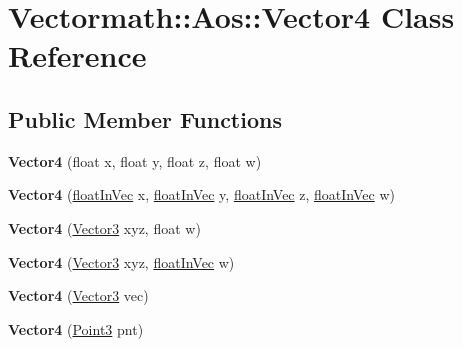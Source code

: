 \hypertarget{classVectormath_1_1Aos_1_1Vector4}{\section{Vectormath\-:\-:Aos\-:\-:Vector4 Class Reference}
\label{classVectormath_1_1Aos_1_1Vector4}
}
\subsection*{Public Member Functions}
\begin{DoxyCompactItemize}
\item 
\hypertarget{classVectormath_1_1Aos_1_1Vector4_a3a9a8ea181eeb2b2a3932149ad5c50ea}{{\bfseries Vector4} (float x, float y, float z, float w)}\label{classVectormath_1_1Aos_1_1Vector4_a3a9a8ea181eeb2b2a3932149ad5c50ea}

\item 
\hypertarget{classVectormath_1_1Aos_1_1Vector4_a648b4da425550137eec6f11d68ffca88}{{\bfseries Vector4} (\hyperlink{classVectormath_1_1floatInVec}{float\-In\-Vec} x, \hyperlink{classVectormath_1_1floatInVec}{float\-In\-Vec} y, \hyperlink{classVectormath_1_1floatInVec}{float\-In\-Vec} z, \hyperlink{classVectormath_1_1floatInVec}{float\-In\-Vec} w)}\label{classVectormath_1_1Aos_1_1Vector4_a648b4da425550137eec6f11d68ffca88}

\item 
\hypertarget{classVectormath_1_1Aos_1_1Vector4_a48ce5327a58b19ab2c6b6072b766c6c1}{{\bfseries Vector4} (\hyperlink{classVectormath_1_1Aos_1_1Vector3}{Vector3} xyz, float w)}\label{classVectormath_1_1Aos_1_1Vector4_a48ce5327a58b19ab2c6b6072b766c6c1}

\item 
\hypertarget{classVectormath_1_1Aos_1_1Vector4_aa77e89a39eb60531ddb91e2be801a3a9}{{\bfseries Vector4} (\hyperlink{classVectormath_1_1Aos_1_1Vector3}{Vector3} xyz, \hyperlink{classVectormath_1_1floatInVec}{float\-In\-Vec} w)}\label{classVectormath_1_1Aos_1_1Vector4_aa77e89a39eb60531ddb91e2be801a3a9}

\item 
\hypertarget{classVectormath_1_1Aos_1_1Vector4_a6a5b8614b89e1d8f656b4687bddd542e}{{\bfseries Vector4} (\hyperlink{classVectormath_1_1Aos_1_1Vector3}{Vector3} vec)}\label{classVectormath_1_1Aos_1_1Vector4_a6a5b8614b89e1d8f656b4687bddd542e}

\item 
\hypertarget{classVectormath_1_1Aos_1_1Vector4_a83c2f3eb3f5b1d248e6cfe483dc722e1}{{\bfseries Vector4} (\hyperlink{classVectormath_1_1Aos_1_1Point3}{Point3} pnt)}\label{classVectormath_1_1Aos_1_1Vector4_a83c2f3eb3f5b1d248e6cfe483dc722e1}


\end{DoxyCompactItemize}
